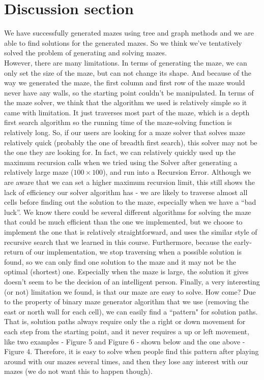 \documentclass[fontsize=11pt]{article}
\begin{document}
\section*{Discussion section}
We have successfully generated mazes using tree and graph methods and we are able to find solutions for the generated mazes. So we think we've tentatively  solved the problem of generating and solving mazes. \\
However, there are many limitations. In terms of generating the maze, we can only set the size of the maze, but can not change its shape. And because of the way we generated the maze, the first column and first row of the maze would never have any walls, so the starting point couldn't be manipulated. In terms of the maze solver, we think that the algorithm we used is relatively simple so it came with limitation. It just traverses most part of the maze, which is a depth first search algorithm so the running time of the maze-solving function is relatively long. So, if our users are looking for a maze solver that solves maze relatively quick (probably the one of breadth first search), this solver may not be the one they are looking for. In fact, we can relatively quickly used up the maximum recursion calls when we tried using the Solver after generating a relatively large maze ($100 \times 100$), and run into a Recursion Error. Although we are aware that we can set a higher maximum recursion limit, this still shows the lack of efficiency our solver algorithm has - we are likely to traverse almost all cells before finding out the solution to the maze, especially when we have a ``bad luck''. We know there could be several different algorithms for solving the maze that could be much efficient than the one we implemented, but we choose to implement the one that is relatively straightforward, and uses the similar style of recursive search that we learned in this course.
Furthermore, because the early-return of our implementation, we stop traversing when a possible solution is found, so we can only find one solution to the maze and it may not be the optimal (shortest) one. Especially when the maze is large, the solution it gives doesn't seem to be the decision of an intelligent person. Finally, a very interesting (or not) limitation we found, is that our maze are easy to solve. How come? Due to the property of binary maze generator algorithm that we use (removing the east or north wall for each cell), we can easily find a ``pattern" for solution paths. That is, solution paths always require only the a right or down movement for each step from the starting point, and it never requires a up or left movement, like two examples - Figure 5 and Figure 6 - shown below and the one above - Figure 4. Therefore, it is easy to solve when people find this pattern after playing around with our mazes several times, and then they lose any interest with our mazes (we do not want this to happen though).
\\
\end{document}
